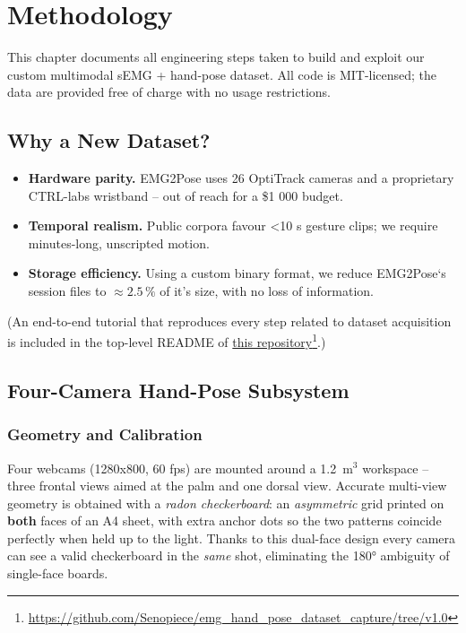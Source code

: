 \chapter{Methodology}
\label{chap:met}

This chapter documents all engineering steps taken to build and exploit our
custom multimodal sEMG + hand-pose dataset. All code is MIT-licensed; the data
are provided free of charge with no usage restrictions.

\section{Why a New Dataset?}

\begin{itemize}
  \item \textbf{Hardware parity.} EMG2Pose uses 26 OptiTrack cameras and a
        proprietary CTRL-labs wristband -- out of reach for a \$1 000 budget.
  \item \textbf{Temporal realism.} Public corpora favour <10 s gesture clips;
        we require minutes-long, unscripted motion.
  \item \textbf{Storage efficiency.} Using a custom binary format, we
        reduce EMG2Pose`s session files to $\approx2.5\,\%$ of it's size, with no loss of
        information.
\end{itemize}

(An end-to-end tutorial that reproduces every step related to dataset acquisition is included in the top-level README of \href{https://github.com/Senopiece/emg_hand_pose_dataset_capture/tree/v1.0}{this repository}\footnote{\url{https://github.com/Senopiece/emg_hand_pose_dataset_capture/tree/v1.0}}.)

\section{Four-Camera Hand-Pose Subsystem}

\subsection{Geometry and Calibration}

Four webcams (1280x800, 60 fps) are mounted around a
\SI{1.2}{\metre}$^{3}$ workspace -- three frontal views aimed at the palm and one
dorsal view. Accurate multi-view geometry is obtained with a \textit{radon
checkerboard}: an \emph{asymmetric} grid printed on \textbf{both} faces of an
A4 sheet, with extra anchor dots so the two patterns coincide perfectly when
held up to the light. Thanks to this dual-face design every camera can see a
valid checkerboard in the \emph{same} shot, eliminating the 180° ambiguity of
single-face boards.

